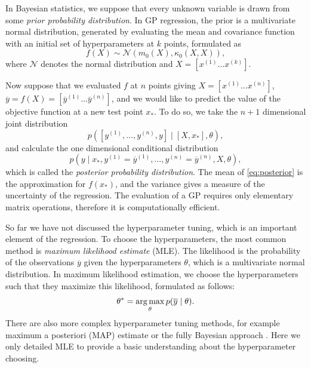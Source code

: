 In Bayesian statistics, we suppose that every unknown variable is drawn from some \textit{prior probability distribution}. In GP regression, the prior is a multivariate normal distribution, generated by evaluating the mean and covariance function with an initial set of hyperparameters at $k$ points, formulated as
\begin{equation}\label{eq:prior}
    f(X) \sim \mathcal{N}(m_0(X),\kappa_0(X,X)),
\end{equation}
where $\mathcal{N}$ denotes the normal distribution and $X=[x^{(1)}\dots x^{(k)}]$.

Now suppose that we evaluated $f$ at $n$ points giving $X=[x^{(1)}\dots x^{(n)}]$, $\overline y =f(X) = [\overline y^{(1)}\dots \overline y^{(n)}]$, and we would like to predict the value of the objective function at a new test point $x_*$. To do so, we take the $n+1$ dimensional joint distribution $$p([y^{(1)},\dots,y^{(n)},y ] \mid [X,x_*],\theta),$$ and calculate the one dimensional conditional distribution 
\begin{equation}\label{eq:posterior}
    p(y\mid x_*,y^{(1)}=\overline y^{(1)}, \dots ,y^{(n)}=\overline y^{(n)},X,\theta ),
\end{equation}
 which is called the \textit{posterior probability distribution}. The mean of \eqref{eq:posterior} is the approximation for $f(x_*)$, and the variance gives a measure of the uncertainty of the regression. The evaluation of a GP requires only elementary matrix operations, therefore it is computationally efficient. 

So far we have not discussed the hyperparameter tuning, which is an important element of the regression. To choose the hyperparameters, the most common method is \textit{maximum likelihood estimate} (MLE). The likelihood is the probability of the observations $\overline{y}$ given the hyperparameters $\theta$, which is a multivariate normal distribution. In maximum likelihood estimation, we choose the hyperparameters such that they maximize this likelihood, formulated as follows:
\begin{equation}
    \theta^* = \operatorname*{arg\,max}_\theta p(\overline{y}\mid \theta).  
\end{equation}
There are also more complex hyperparameter tuning methods, for example maximum a posteriori (MAP) estimate or the fully Bayesian approach \cite{RW2006}. Here we only detailed MLE to provide a basic understanding about the hyperparameter choosing.

